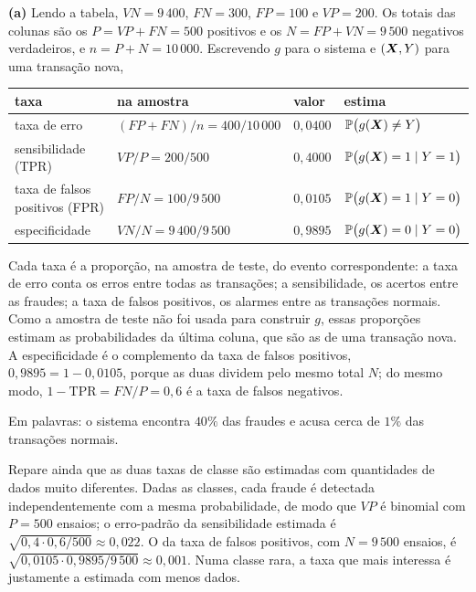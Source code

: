 \documentclass[11pt,a4paper]{article}
\begin{document}
\begin{solucao}
\textbf{(a)} Lendo a tabela, $VN=9\,400$, $FN=300$, $FP=100$ e $VP=200$. Os totais das
colunas são os $P=VP+FN=500$ positivos e os $N=FP+VN=9\,500$ negativos verdadeiros,
e $n=P+N=10\,000$. Escrevendo $g$ para o sistema e $(\bm{X},Y)$ para uma transação nova,
\begin{center}\small
\renewcommand{\arraystretch}{1.4}
\begin{tabular}{@{}llll@{}}
\toprule
taxa & na amostra & valor & estima \\
\midrule
taxa de erro                   & $(FP+FN)/n=400/10\,000$ & $0{,}0400$ & $\mathbb{P}\big(g(\bm{X})\neq Y\big)$ \\
sensibilidade (TPR)            & $VP/P=200/500$          & $0{,}4000$ & $\mathbb{P}\big(g(\bm{X})=1\mid Y=1\big)$ \\
taxa de falsos positivos (FPR) & $FP/N=100/9\,500$       & $0{,}0105$ & $\mathbb{P}\big(g(\bm{X})=1\mid Y=0\big)$ \\
especificidade                 & $VN/N=9\,400/9\,500$    & $0{,}9895$ & $\mathbb{P}\big(g(\bm{X})=0\mid Y=0\big)$ \\
\bottomrule
\end{tabular}
\end{center}
Cada taxa é a proporção, na amostra de teste, do evento correspondente: a taxa de
erro conta os erros entre todas as transações; a sensibilidade, os acertos entre as
fraudes; a taxa de falsos positivos, os alarmes entre as transações normais. Como a
amostra de teste não foi usada para construir $g$, essas proporções estimam as
probabilidades da última coluna, que são as de uma transação nova. A especificidade
é o complemento da taxa de falsos positivos, $0{,}9895=1-0{,}0105$, porque as duas
dividem pelo mesmo total $N$; do mesmo modo, $1-\text{TPR}=FN/P=0{,}6$ é a taxa de
falsos negativos.

Em palavras: o sistema encontra $40\%$ das fraudes e acusa cerca de $1\%$ das
transações normais.

Repare ainda que as duas taxas de classe são estimadas com quantidades de dados muito
diferentes. Dadas as classes, cada fraude é detectada independentemente com a mesma
probabilidade, de modo que $VP$ é binomial com $P=500$ ensaios; o erro-padrão da
sensibilidade estimada é $\sqrt{0{,}4\cdot0{,}6/500}\approx0{,}022$. O da taxa de falsos
positivos, com $N=9\,500$ ensaios, é $\sqrt{0{,}0105\cdot0{,}9895/9\,500}\approx0{,}001$.
Numa classe rara, a taxa que mais interessa é justamente a estimada com menos dados.


\end{solucao}
\end{document}
